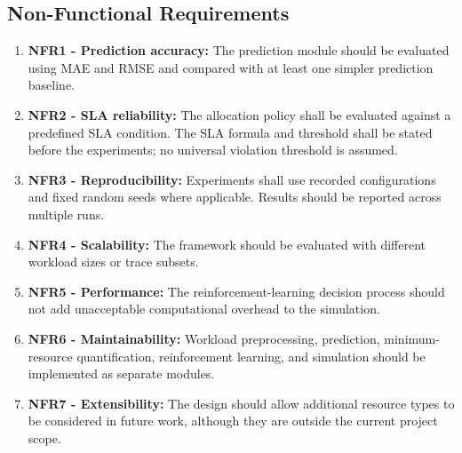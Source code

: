 \documentclass[12pt,a4paper]{report}
\begin{document}
\subsection{Non-Functional Requirements}
\begin{enumerate}
    \item \textbf{NFR1 - Prediction accuracy:} The prediction module should be evaluated using MAE and RMSE and compared with at least one simpler prediction baseline.
    \item \textbf{NFR2 - SLA reliability:} The allocation policy shall be evaluated against a predefined SLA condition. The SLA formula and threshold shall be stated before the experiments; no universal violation threshold is assumed.
    \item \textbf{NFR3 - Reproducibility:} Experiments shall use recorded configurations and fixed random seeds where applicable. Results should be reported across multiple runs.
    \item \textbf{NFR4 - Scalability:} The framework should be evaluated with different workload sizes or trace subsets.
    \item \textbf{NFR5 - Performance:} The reinforcement-learning decision process should not add unacceptable computational overhead to the simulation.
    \item \textbf{NFR6 - Maintainability:} Workload preprocessing, prediction, minimum-resource quantification, reinforcement learning, and simulation should be implemented as separate modules.
    \item \textbf{NFR7 - Extensibility:} The design should allow additional resource types to be considered in future work, although they are outside the current project scope.
\end{enumerate}
\lipsum[37-39]
\end{document}
